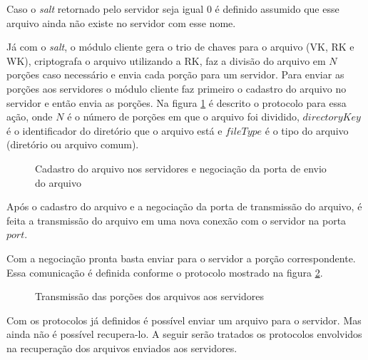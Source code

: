         Caso o \textit{salt} retornado pelo servidor seja igual $0$ é definido assumido que esse arquivo ainda não existe no servidor com esse nome.
        
        Já com o \textit{salt}, o módulo cliente gera o trio de chaves para o arquivo (VK, RK e WK), criptografa o arquivo utilizando a RK, faz a divisão do arquivo em $N$ porções caso necessário e envia cada porção para um servidor. Para enviar as porções aos servidores o módulo cliente faz primeiro o cadastro do arquivo no servidor e então envia as porções. Na figura \ref{fig:protSendFile} é descrito o protocolo para essa ação, onde $N$ é o número de porções em que o arquivo foi dividido, $directoryKey$ é o identificador do diretório que o arquivo está e $fileType$ é o tipo do arquivo (diretório ou arquivo comum).
        
        \begin{figure}[!ht]
        
        \caption{Cadastro do arquivo nos servidores e negociação da porta de envio do arquivo}
        \label{fig:protSendFile}
        \end{figure}
        
        Após o cadastro do arquivo e a negociação da porta de transmissão do arquivo, é feita a transmissão do arquivo em uma nova conexão com o servidor na porta $port$.
        
        Com a negociação pronta basta enviar para o servidor a porção correspondente. Essa comunicação é definida conforme o protocolo mostrado na figura \ref{fig:protSendFileData}.
        
        \begin{figure}[!ht]
        \caption{Transmissão das porções dos arquivos aos servidores}
        \label{fig:protSendFileData}
        \end{figure}
        
        
        Com os protocolos já definidos é possível enviar um arquivo para o servidor. Mas ainda não é possível recupera-lo. A seguir serão tratados os protocolos envolvidos na recuperação dos arquivos enviados aos servidores.
        
